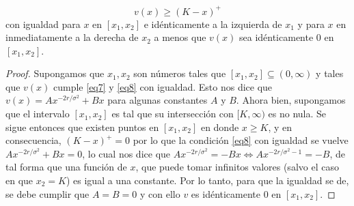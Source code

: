 \documentclass[letterpaper]{article}
\newcommand{\1}{\mathds{1}}
\theoremstyle{definition}
\theoremstyle{definition}
\theoremstyle{definition}
\theoremstyle{definition}
\theoremstyle{definition}
\begin{document}
\begin{itemize}
\begin{enumerate}
        \begin{equation}\label{eq8}
            v(x)\geq (K-x)^{+}    
        \end{equation}
        con igualdad para $x$ en $[x_1,x_2]$ e idénticamente a la izquierda de $x_1$ y para $x$ en inmediatamente 
        a la derecha de $x_2$ a menos que $v(x)$ sea idénticamente 0 en $[x_1,x_2]$.
        \begin{proof} 
         Supongamos que $x_1,x_2$ son números tales que $[x_1,x_2]\subseteq (0,\infty)$ y tales que 
         $v(x)$ cumple \eqref{eq7} y \eqref{eq8} con igualdad. Esto nos dice que $v(x)=Ax^{-2r/\sigma^2}+Bx$ para algunas constantes
         $A$ y $B$. Ahora bien, supongamos que el intervalo $[x_1,x_2]$ es tal que su intersección con $[K,\infty)$ es no nula. Se sigue 
         entonces que existen puntos en $[x_1,x_2]$ en donde $x\geq K$, y en consecuencia, $(K-x)^{+}=0$ por lo que la condición 
         \eqref{eq8} con igualdad se vuelve $Ax^{-2r/\sigma^2}+Bx=0$, lo cual nos dice que 
         $Ax^{-2r/\sigma^2}=-Bx \iff Ax^{-2r/\sigma^2-1}=-B$, de tal forma que una función de $x$, que 
         puede tomar infinitos valores (salvo el caso en que $x_2=K$) es igual a una constante. Por lo tanto, 
         para que la igualdad se de, se debe cumplir que $A=B=0$ y con ello $v$ es idénticamente 0 en $[x_1,x_2]$.
         \newline
         

\end{proof}
\end{enumerate}
\end{itemize}
\end{document}
